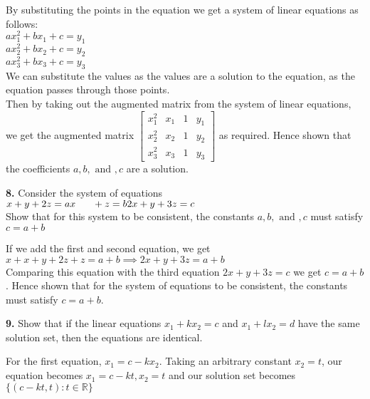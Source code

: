 \documentclass[addpoints]{exam}
\begin{document}
\begin{questions}
\begin{solution}
        By substituting the points in the equation we get a system of linear equations as follows: \\ 
        $ ax_{1}^{2} + bx_{1} + c = y_{1} $ \\ 
        $ ax_{2}^{2} + bx_{2} + c = y_{2} $ \\ 
        $ ax_{3}^{2} + bx_{3} + c = y_{3} $ \\ 
        We can substitute the values as the values are a solution to the equation, as the equation passes through those points. \\ 
        Then by taking out the augmented matrix from the system of linear equations, we get the augmented matrix $ \begin{bmatrix}
            x_{1}^{2} & x_1 & 1 & y_1 \\ 
            x_{2}^{2} & x_2 & 1 & y_2 \\ 
            x_{3}^{2} & x_3 & 1 & y_3
        \end{bmatrix} $ as required. Hence shown that the coefficients $a, b, \text{ and }, c $ are a solution.
    \end{solution}

    \question
    \textbf{8. } Consider the system of equations \\
    $   x + y + 2z = a \\ 
        x \text{\hspace{6mm}} + z = b \\ 
        2x + y + 3z = c$ \\ 
    Show that for this system to be consistent, the constants $ a, b, \text{ and }, c $ must satisfy $ c = a + b $
    \begin{solution}
        If we add the first and second equation, we get $ x + x + y + 2z + z = a + b \implies 2x + y + 3z = a + b$ \\ 
        Comparing this equation with the third equation $ 2x + y + 3z = c $ we get $ c = a + b $. Hence shown that for the system of equations to be consistent, the constants must satisfy $ c = a + b $.  
    \end{solution}

    \question
    \textbf{9. } Show that if the linear equations $ x_1 + kx_2 = c $ and $ x_1 + lx_2 = d $ have the same solution set, then the equations are identical. 
    \begin{solution}
        
        For the first equation, $ x_1 = c - kx_2 $. Taking an arbitrary constant $x_2 = t$, our equation becomes $ x_1 = c - kt, x_2 = t $ and our solution set becomes $ \{ (c - kt, t) : t \in \mathbb{R} \} $ 


\end{solution}
\end{questions}
\end{document}
